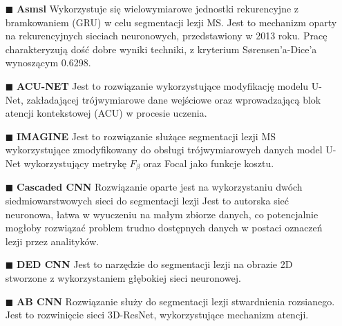 \begin{itemize}

    \item[$\blacksquare$]  \textbf{Asmsl}\cite{10.1007/978-3-319-75238-9_3} Wykorzystuje się wielowymiarowe jednostki rekurencyjne z bramkowaniem (GRU)  w celu segmentacji lezji MS\cite{Sadeghibakhi2022-ox}. Jest to mechanizm oparty na rekurencyjnych sieciach neuronowych, przedstawiony w 2013 roku\cite{cho2014learning}. Pracę charakteryzują dość dobre wyniki techniki, z kryterium Sørensen'a-Dice'a wynoszącym 0.6298.

    \item[$\blacksquare$] \textbf{ACU-NET}\cite{hu2020} Jest to rozwiązanie wykorzystujące modyfikację modelu U-Net, zakładającej trójwymiarowe dane wejściowe oraz wprowadzającą blok atencji kontekstowej  (ACU) w procesie uczenia. 

    \item[$\blacksquare$] \textbf{IMAGINE}\cite{Hashemi2019} Jest to rozwiązanie służące segmentacji lezji MS wykorzystujące zmodyfikowany do obsługi trójwymiarowych danych model U-Net wykorzystujący metrykę $F_\beta$ oraz Focal jako funkcje kosztu.    

    \item [$\blacksquare$] \textbf{Cascaded CNN}\cite{valverde2017improving} Rozwiązanie oparte jest na wykorzystaniu dwóch siedmiowarstwowych sieci do segmentacji lezji  Jest to autorska sieć neuronowa, łatwa w wyuczeniu na małym zbiorze danych, co potencjalnie mogłoby rozwiązać problem trudno dostępnych danych w postaci oznaczeń lezji przez analityków.

    \item [$\blacksquare$] \textbf{DED CNN}\cite{10.1007/978-3-030-11723-8_13} Jest to narzędzie do segmentacji lezji na obrazie 2D stworzone z wykorzystaniem głębokiej sieci neuronowej.

    \item [$\blacksquare$] \textbf{AB CNN}\cite{Sadeghibakhi2022-ox} Rozwiązanie służy do segmentacji lezji stwardnienia rozsianego. Jest to rozwinięcie sieci 3D-ResNet, wykorzystujące mechanizm atencji.

    
    
\end{itemize}

\par 
